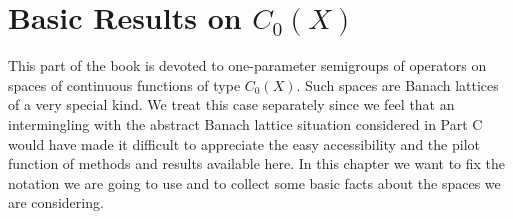 
%
%
%
%
%
%
%
%
%
%
%
%


\chapter{Basic Results on $C_{0}(X)$}\label{chap:B-I}
This part of the book is devoted to one-parameter semigroups of operators on spaces of continuous functions of type $C_{0}(X)$.
Such spaces are Banach lattices of a very special kind.
We treat this case separately since we feel that an intermingling with the abstract Banach lattice situation considered in Part C would have made it difficult to appreciate the easy accessibility and the pilot function of methods and results available here.
In this chapter we want to fix the notation we are going to use and to collect some basic facts about the spaces we are considering.

